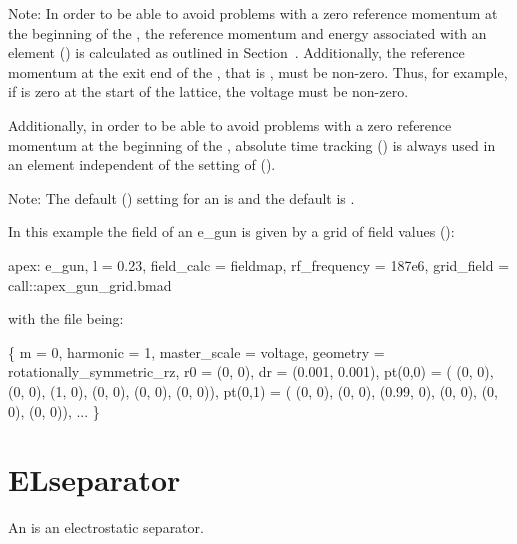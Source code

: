 Note: In order to be able to avoid problems with a zero reference momentum at the beginning of the
, the reference momentum and energy associated with an  element
() is calculated as outlined in Section~. Additionally, the
reference momentum at the exit end of the , that is , must be non-zero. Thus, for
example, if  is zero at the start of the lattice, the  voltage must be non-zero.

Additionally, in order to be able to avoid problems with a zero reference momentum at the
beginning of the , absolute time tracking () is always used in
an  element independent of the setting of 
().

Note: The default  () setting for an
 is  and the default
 is .

In this example the field of an e_gun is given by a grid of field
values ():
\begin{example}
  apex: e_gun, l = 0.23, field_calc = fieldmap, rf_frequency = 187e6, 
                grid_field = call::apex_gun_grid.bmad
\end{example}
with the file  being:
\begin{example}
  \{
    m = 0, harmonic = 1,
    master_scale = voltage,
    geometry = rotationally_symmetric_rz,
    r0 = (0, 0),
    dr = (0.001, 0.001),
    pt(0,0) = ( (0, 0), (0, 0), (1, 0),  (0, 0), (0, 0), (0, 0)),
    pt(0,1) = ( (0, 0), (0, 0), (0.99, 0),  (0, 0), (0, 0), (0, 0)),
    ... \}
\end{example}

\newpage

\section{ELseparator}
\label{s:elsep}

An  is an electrostatic separator.

